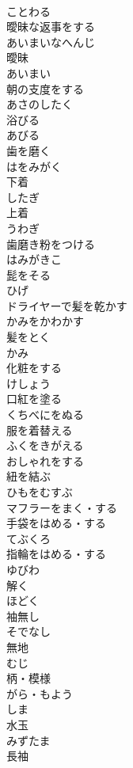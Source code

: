 \documentclass[8pt]{extreport}
\begin{document}
\begin{CJK}{UTF8}{min}
\\	ことわる
\\	曖昧な返事をする	
\\	あいまいなへんじ
\\	曖昧	
\\	あいまい
\\	朝の支度をする	
\\	あさのしたく
\\	浴びる	
\\	あびる
\\	歯を磨く	
\\	はをみがく
\\	下着	
\\	したぎ
\\	上着	
\\	うわぎ
\\	歯磨き粉をつける	
\\	はみがきこ
\\	髭をそる	
\\	ひげ
\\	ドライヤーで髪を乾かす	
\\	かみをかわかす
\\	髪をとく	
\\	かみ
\\	化粧をする	
\\	けしょう
\\	口紅を塗る	
\\	くちべにをぬる
\\	服を着替える	
\\	ふくをきがえる
\\	おしゃれをする	
\\	紐を結ぶ	
\\	ひもをむすぶ
\\	マフラーをまく・する	
\\	手袋をはめる・する	
\\	てぶくろ
\\	指輪をはめる・する	
\\	ゆびわ
\\	解く	
\\	ほどく
\\	袖無し	
\\	そでなし
\\	無地	
\\	むじ
\\	柄・模様	
\\	がら・もよう
\\	しま	
\\	水玉	
\\	みずたま
\\	長袖	

\end{CJK}
\end{document}
